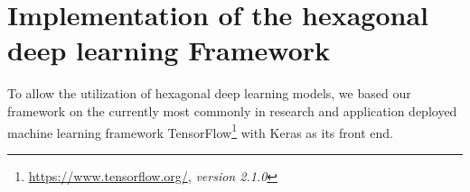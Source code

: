 \documentclass{article}
\begin{document}
\begin{table}[tb]
	\renewcommand{\arraystretch}{1.1}
	\centering


	\caption{S- / H-SWWAE layer configuration.}
	\label{table:T_1}
\end{table}

\begin{table}[tb]
	\renewcommand{\arraystretch}{1.1}
	\centering


	\caption{S- / H-ACGAN layer configuration.}
	\label{table:T_2}
\end{table}


\section{Implementation of the hexagonal deep learning Framework}

To allow the utilization of hexagonal deep learning models, we based our framework on the currently most commonly in research and application deployed machine learning framework TensorFlow\footnote{\url{https://www.tensorflow.org/}, \textit{version 2.1.0}} with Keras as its front end.
\end{document}
